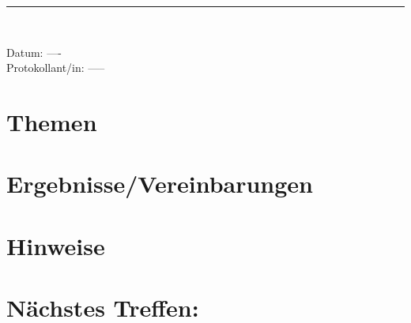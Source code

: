 \begin{center}  
\vspace{0.5pt}\nointerlineskip\rule{\textwidth}{0.2pt}\\ 
\vspace{0.5pt}\nointerlineskip
\end{center} 
\large Datum: ----\vspace{3pt}\\\large Protokollant/in: -----
\section{Themen}
\section{Ergebnisse/Vereinbarungen}
\section{Hinweise}
\section*{Nächstes Treffen:}
